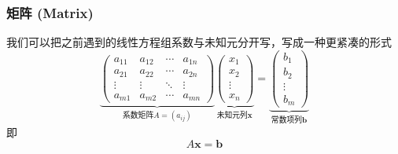 
\begin{frame}
\frametitle{矩阵 (Matrix)}

我们可以把之前遇到的线性方程组系数与未知元分开写，写成一种更紧凑的形式
\[
\underbrace{\begin{pmatrix}
a_{11} & a_{12} & \cdots & a_{1n} \\
a_{21} & a_{22} & \cdots & a_{2n} \\
\vdots & \vdots & \ddots & \vdots \\
a_{m1} & a_{m2} & \cdots & a_{mn}
\end{pmatrix}}_{\text{系数矩阵} A = (a_{ij})} \underbrace{\begin{pmatrix}
x_1 \\ x_2 \\ \vdots \\ x_n
\end{pmatrix}}_{\text{未知元列}\mathbf{x}} =
\underbrace{\begin{pmatrix}
b_1 \\ b_2 \\ \vdots \\ b_m
\end{pmatrix}}_{\text{常数项列}\mathbf{b}}
\]
即
\[A\mathbf{x} = \mathbf{b}\]

\end{frame}


